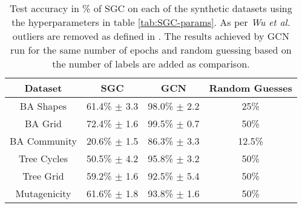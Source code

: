 \begin{table}
    \centering
    \begin{tabular}{c|c|cc}
        \textbf{Dataset} & \textbf{SGC} & \textbf{GCN} & \textbf{Random Guesses} \\
        \midrule
        BA Shapes       & 61.4\% $\pm$ 3.3 & 98.0\% $\pm$ 2.2 & 25\% \\
        BA Grid         & 72.4\% $\pm$ 1.6 & 99.5\% $\pm$ 0.7 & 50\% \\
        BA Community    & 20.6\% $\pm$ 1.5 & 86.3\% $\pm$ 3.3 & 12.5\% \\
        Tree Cycles     & 50.5\% $\pm$ 4.2 & 95.8\% $\pm$ 3.2 & 50\% \\
        Tree Grid       & 59.2\% $\pm$ 1.6 & 92.5\% $\pm$ 5.4 & 50\% \\
        \midrule
        Mutagenicity    & 61.6\% $\pm$ 1.8 & 93.8\% $\pm$ 1.6 & 50\% \\
    \end{tabular}
    \caption{Test accuracy in \% of SGC on each of the synthetic datasets using the hyperparameters in table \ref{tab:SGC-params}. As per \textit{Wu et al.}\cite{wu2019simplifying} outliers are removed as defined in . The results achieved by GCN run for the same number of epochs and random guessing based on the number of labels are added as comparison.}
    \label{tab:SGC-acc}
\end{table}

